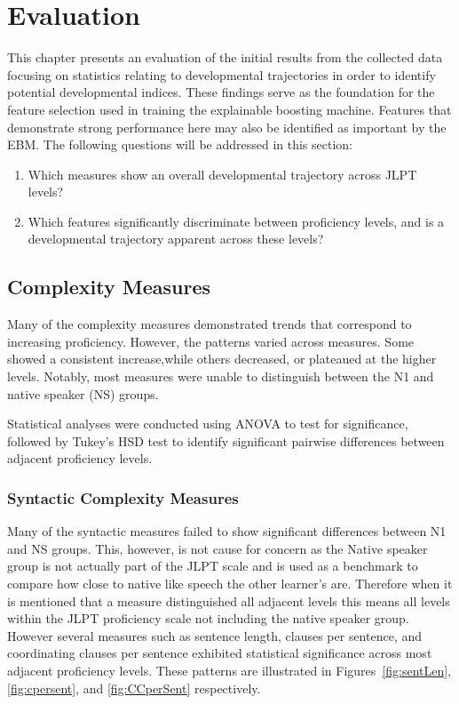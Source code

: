 \chapter{Evaluation} 
This chapter presents an evaluation of the initial results from the collected data focusing on statistics relating to
developmental trajectories in order to identify potential developmental indices. These findings serve as the
foundation
for the feature selection used in training the explainable boosting machine. Features that demonstrate strong
performance here may also be identified as important by the EBM. The following questions will be addressed in this
section:

\begin{enumerate}
    \item Which measures show an overall developmental trajectory across JLPT levels?
    \item Which features significantly discriminate between proficiency levels, and is a developmental trajectory
    apparent across these levels?
\end{enumerate}

\section{Complexity Measures}

Many of the complexity measures demonstrated trends that correspond to increasing proficiency. However, the patterns
varied across measures. Some showed a consistent increase,while others
decreased, or plateaued at the
higher levels. Notably, most measures were unable to distinguish between the N1 and native speaker (NS) groups.

Statistical analyses were conducted using ANOVA to test for significance, followed by Tukey's HSD test to identify
significant pairwise differences between adjacent proficiency levels.

\subsection{Syntactic Complexity Measures}


Many of the syntactic measures failed to show significant differences between N1 and NS groups. This, however, is not
cause for concern as the Native speaker group is not actually part of the JLPT scale and is used as a benchmark to
compare how close to native like speech the other learner's are. Therefore when it is mentioned that a measure
distinguished all adjacent levels this means all levels within the JLPT proficiency scale not including the native
speaker group.
However several measures
such as sentence length, clauses per sentence, and coordinating clauses per sentence exhibited statistical significance
across most
adjacent proficiency levels. These patterns are illustrated in Figures~\ref{fig:sentLen}, \ref{fig:cpersent}, and \ref{fig:CCperSent} respectively.

